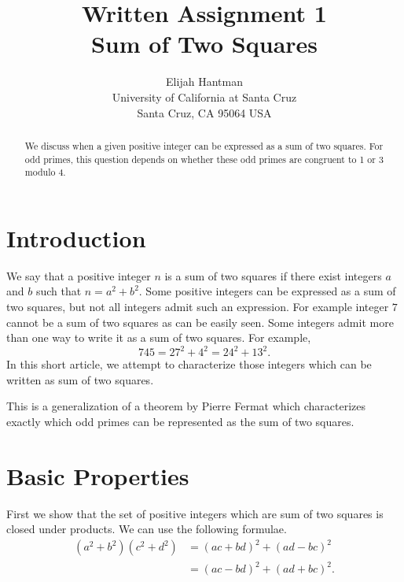 \documentclass[12pt]{article}
\begin{document}
\title{ Written Assignment 1\\
 Sum of Two Squares}

\author{ Elijah Hantman \\ 
University of California at Santa Cruz\\
Santa Cruz, CA 95064 USA }

\maketitle

\begin{abstract}
We discuss when a given positive integer can be expressed as a sum of two squares. For odd primes, this question depends on whether these odd primes are congruent to 1 or 3 modulo 4.

\end{abstract}


\section{Introduction}

We say that a positive integer $n$ is a sum of two squares if there exist integers $a$ and $b$ such that $n=a^2+b^2$. 
Some positive integers can be expressed as a sum of two squares, but not all integers admit such an expression. For example integer $7$ cannot be a sum of two squares as can be easily seen. Some integers admit more than one way to write it as a sum of two squares. For example, 
$$
745=27^2+4^2=24^2+13^2.
$$
In this short article, we attempt to characterize those integers which can be written as sum of two squares. 

This is a generalization of a theorem by Pierre Fermat which characterizes exactly which odd primes can be
represented as the sum of two squares.

\section{Basic Properties} 
    
First we show that the set of positive integers which are sum of two squares is closed under products. We can use the following formulae.
\begin{align*}
(a^2+b^2)(c^2+d^2)&=(ac+bd)^2+(ad - bc)^2 \\
&=(ac-bd)^2+(ad + bc)^2.
\end{align*}
\end{document}
